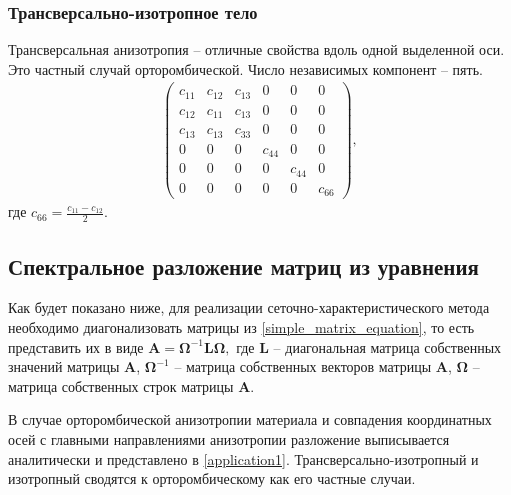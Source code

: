 \subsubsection{Трансверсально-изотропное тело}
Трансверсальная анизотропия -- отличные свойства вдоль одной выделенной оси. Это частный случай орторомбической. Число независимых компонент -- пять.	
\begin{align}
\label{vert_trans_tensor}
\left( \begin{array}{cccccccccccc}
c_{11} & c_{12} & c_{13} & 0 & 0 & 0 \\ 
c_{12} & c_{11} & c_{13} & 0 & 0 & 0 \\ 
c_{13} & c_{13} & c_{33} & 0 & 0 & 0 \\ 
0 & 0 & 0 & c_{44} & 0 & 0 \\ 
0 & 0 & 0 & 0 & c_{44} & 0 \\ 
0 & 0 & 0 & 0 & 0 & c_{66}
\end{array} \right){},
\end{align}
где $ c_{66} = \frac{c_{11} - c_{12}}{2} $.


\subsection{Спектральное разложение матриц из уравнения}
Как будет показано ниже, для реализации сеточно\hyp{}характеристического метода необходимо диагонализовать матрицы из \eqref{simple_matrix_equation},
то есть представить их в виде $\mathbf{A} = \mathbf{\Omega}^{-1} \mathbf{L} \mathbf{\Omega},$  где $\mathbf{L}$ -- диагональная матрица собственных значений матрицы $\mathbf{A}$, $\mathbf{\Omega}^{-1}$ -- матрица собственных векторов матрицы $\mathbf{A}$, $\mathbf{\Omega}$ -- матрица собственных строк матрицы $\mathbf{A}$.

В случае орторомбической анизотропии материала и совпадения координатных осей с главными направлениями анизотропии разложение выписывается аналитически и представлено в \ref{application1}. Трансверсально-изотропный и изотропный сводятся к орторомбическому как его частные случаи.

